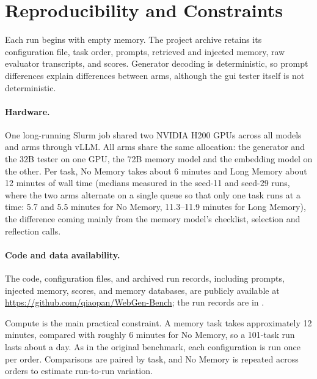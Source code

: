\section{Reproducibility and Constraints}
Each run begins with empty memory. The project archive retains its configuration file, task order, prompts, retrieved and injected memory, raw evaluator transcripts, and scores. Generator decoding is deterministic, so prompt differences explain differences between arms, although the \gls{gui} tester itself is not deterministic.

\paragraph{Hardware.} One long-running Slurm job shared two NVIDIA H200 GPUs across all models and arms through vLLM. All arms share the same allocation: the generator and the 32B tester on one GPU, the 72B memory model and the embedding model on the other. Per task, No Memory takes about 6 minutes and Long Memory about 12 minutes of wall time (medians measured in the seed-11 and seed-29 runs, where the two arms alternate on a single queue so that only one task runs at a time: 5.7 and 5.5 minutes for No Memory, 11.3--11.9 minutes for Long Memory), the difference coming mainly from the memory model's checklist, selection and reflection calls.

\paragraph{Code and data availability.} The code, configuration files, and archived run records, including prompts, injected memory, scores, and memory databases, are publicly available at \url{https://github.com/qiaopan/WebGen-Bench}; the run records are in .

Compute is the main practical constraint. A memory task takes approximately 12 minutes, compared with roughly 6 minutes for No Memory, so a 101-task run lasts about a day. As in the original benchmark, each configuration is run once per order. Comparisons are paired by task, and No Memory is repeated across orders to estimate run-to-run variation.

